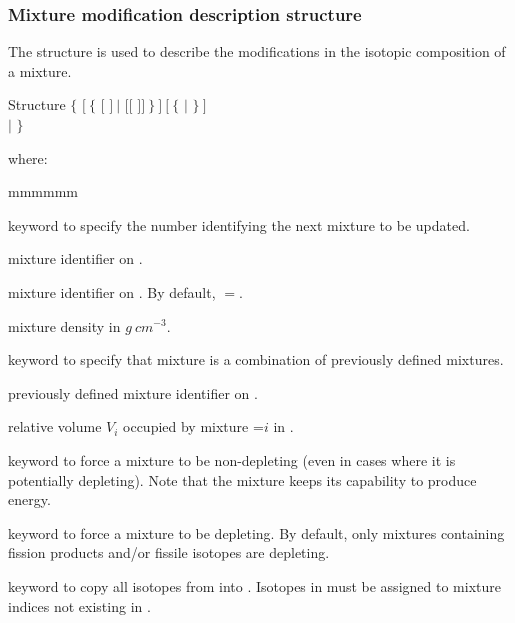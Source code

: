 \vskip 0.25cm
\goodbreak

\subsubsection{Mixture modification description structure}\label{sect:descmix2}

The structure  is used to describe the modifications in the isotopic composition of a mixture.

\begin{DataStructure}{Structure }
$\{$   $[~\{$  $[$  $]~|$  $[[$   $]]~\}~]~[~\{$  $|$  $\}~]$ \\
\hskip 1.0cm $|$  $\}$
\end{DataStructure}

\vspace{-0.15cm}

\noindent
where:

\begin{ListeDeDescription}{mmmmmm}

\item[\moc{MIX}] keyword to specify the number identifying the next mixture to be updated.

\item[\dusa{matnum}] mixture identifier on . 

\item[\dusa{matold}] mixture identifier on . By default, $=$.

\item[\dusa{denmix}] mixture density in $g \ cm^{-3}$. 

\item[\moc{COMB}] keyword to specify that mixture  is a combination of previously defined mixtures.

\item[\dusa{mati}] previously defined mixture identifier on .

\item[\dusa{relvol}] relative volume $V_{i}$ occupied by mixture =$i$ in .

\item[\moc{NOEV}] keyword to force a mixture to be non-depleting (even in
cases where it is potentially depleting). Note that the mixture keeps its
capability to produce energy.

\item[\moc{EVOL}] keyword to force a mixture to be depleting. By default, only
mixtures containing fission products and/or fissile isotopes are depleting.

\item[\moc{ALL}] keyword to copy all isotopes from  into . Isotopes in 
must be assigned to mixture indices not existing in .

\end{ListeDeDescription}

